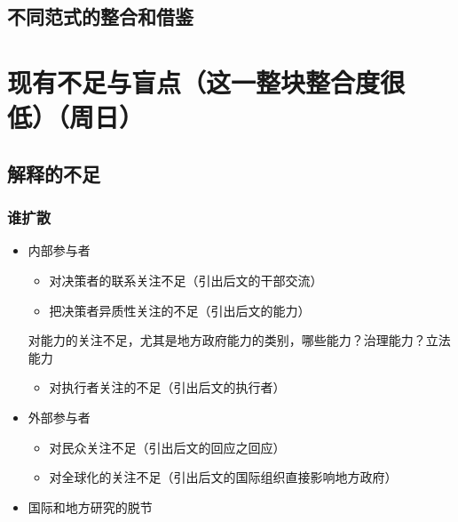 \documentclass[
  12pt,
]{ctexart}
\providecommand{\tightlist}{%
  \setlength{\itemsep}{0pt}\setlength{\parskip}{0pt}}
\begin{document}
\hypertarget{ux4e0dux540cux8303ux5f0fux7684ux6574ux5408ux548cux501fux9274}{%
\subsection{不同范式的整合和借鉴}\label{ux4e0dux540cux8303ux5f0fux7684ux6574ux5408ux548cux501fux9274}}

\hypertarget{ux73b0ux6709ux4e0dux8db3ux4e0eux76f2ux70b9ux8fd9ux4e00ux6574ux5757ux6574ux5408ux5ea6ux5f88ux4f4eux5468ux65e5}{%
\section{现有不足与盲点（这一整块整合度很低）（周日）}\label{ux73b0ux6709ux4e0dux8db3ux4e0eux76f2ux70b9ux8fd9ux4e00ux6574ux5757ux6574ux5408ux5ea6ux5f88ux4f4eux5468ux65e5}}

\hypertarget{ux89e3ux91caux7684ux4e0dux8db3}{%
\subsection{解释的不足}\label{ux89e3ux91caux7684ux4e0dux8db3}}

\hypertarget{ux8c01ux6269ux6563}{%
\subsubsection{谁扩散}\label{ux8c01ux6269ux6563}}

\begin{itemize}
\item
  内部参与者

  \begin{itemize}
  \item
    对决策者的联系关注不足（引出后文的干部交流）
  \item
    把决策者异质性关注的不足（引出后文的能力）
  \end{itemize}

  对能力的关注不足，尤其是地方政府能力的类别，哪些能力？治理能力？立法能力

  \begin{itemize}
  \tightlist
  \item
    对执行者关注的不足（引出后文的执行者）
  \end{itemize}
\item
  外部参与者

  \begin{itemize}
  \item
    对民众关注不足（引出后文的回应之回应）
  \item
    对全球化的关注不足（引出后文的国际组织直接影响地方政府）
  \end{itemize}
\item
  国际和地方研究的脱节
\end{itemize}
\end{document}
